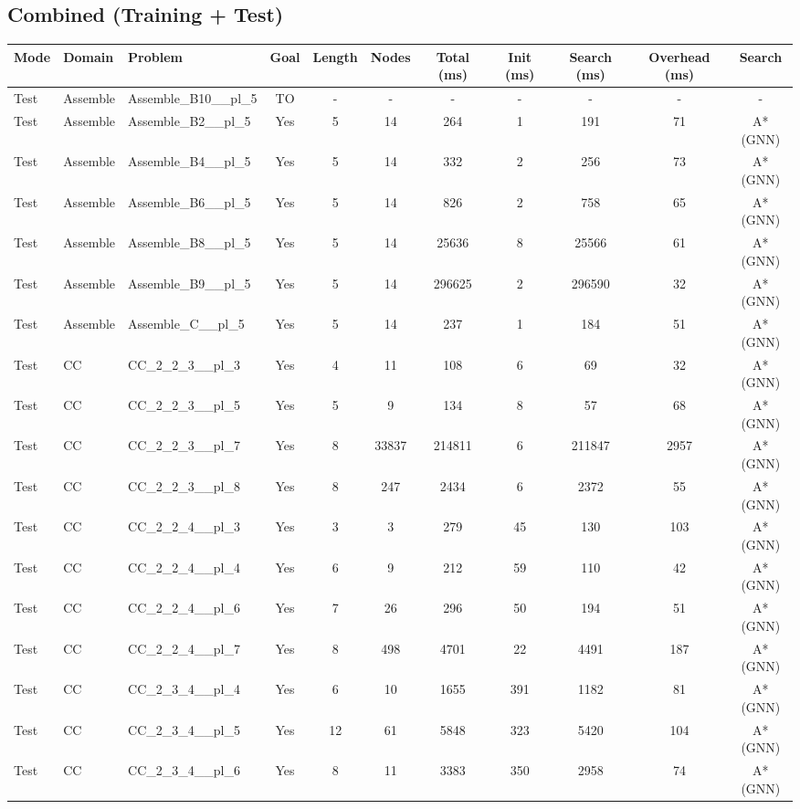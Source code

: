 \documentclass{article}
\begin{document}
\subsection*{Combined (Training + Test)}
\begin{tabular}{lllcccccccc}
\toprule
Mode & Domain & Problem & Goal & Length & Nodes & Total (ms) & Init (ms) & Search (ms) & Overhead (ms) & Search \\
\midrule
Test & Assemble & Assemble\_B10\_\_pl\_5 & TO & - & - & - & - & - & - & - \\
Test & Assemble & Assemble\_B2\_\_pl\_5 & Yes & 5 & 14 & 264 & 1 & 191 & 71 & A*(GNN) \\
Test & Assemble & Assemble\_B4\_\_pl\_5 & Yes & 5 & 14 & 332 & 2 & 256 & 73 & A*(GNN) \\
Test & Assemble & Assemble\_B6\_\_pl\_5 & Yes & 5 & 14 & 826 & 2 & 758 & 65 & A*(GNN) \\
Test & Assemble & Assemble\_B8\_\_pl\_5 & Yes & 5 & 14 & 25636 & 8 & 25566 & 61 & A*(GNN) \\
Test & Assemble & Assemble\_B9\_\_pl\_5 & Yes & 5 & 14 & 296625 & 2 & 296590 & 32 & A*(GNN) \\
Test & Assemble & Assemble\_C\_\_pl\_5 & Yes & 5 & 14 & 237 & 1 & 184 & 51 & A*(GNN) \\
Test & CC & CC\_2\_2\_3\_\_pl\_3 & Yes & 4 & 11 & 108 & 6 & 69 & 32 & A*(GNN) \\
Test & CC & CC\_2\_2\_3\_\_pl\_5 & Yes & 5 & 9 & 134 & 8 & 57 & 68 & A*(GNN) \\
Test & CC & CC\_2\_2\_3\_\_pl\_7 & Yes & 8 & 33837 & 214811 & 6 & 211847 & 2957 & A*(GNN) \\
Test & CC & CC\_2\_2\_3\_\_pl\_8 & Yes & 8 & 247 & 2434 & 6 & 2372 & 55 & A*(GNN) \\
Test & CC & CC\_2\_2\_4\_\_pl\_3 & Yes & 3 & 3 & 279 & 45 & 130 & 103 & A*(GNN) \\
Test & CC & CC\_2\_2\_4\_\_pl\_4 & Yes & 6 & 9 & 212 & 59 & 110 & 42 & A*(GNN) \\
Test & CC & CC\_2\_2\_4\_\_pl\_6 & Yes & 7 & 26 & 296 & 50 & 194 & 51 & A*(GNN) \\
Test & CC & CC\_2\_2\_4\_\_pl\_7 & Yes & 8 & 498 & 4701 & 22 & 4491 & 187 & A*(GNN) \\
Test & CC & CC\_2\_3\_4\_\_pl\_4 & Yes & 6 & 10 & 1655 & 391 & 1182 & 81 & A*(GNN) \\
Test & CC & CC\_2\_3\_4\_\_pl\_5 & Yes & 12 & 61 & 5848 & 323 & 5420 & 104 & A*(GNN) \\
Test & CC & CC\_2\_3\_4\_\_pl\_6 & Yes & 8 & 11 & 3383 & 350 & 2958 & 74 & A*(GNN) \\

\end{tabular}
\end{document}
